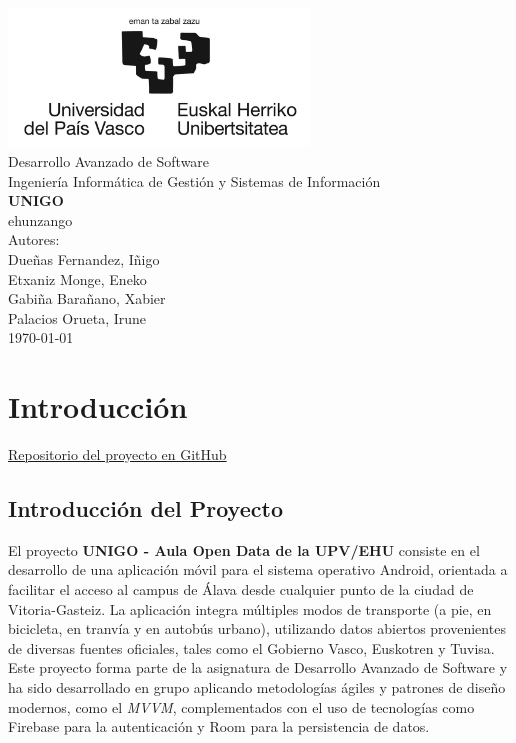 \documentclass[a4paper,12pt]{report}
\begin{document}
  \begin{titlepage}
    \centering
    \includegraphics[width=0.6\textwidth]{../.img/logoEHU_largo.jpg}\\
    \vspace{1cm}
    \LARGE Desarrollo Avanzado de Software\\
    \vspace{0.5cm}
    \Large Ingeniería Informática de Gestión y Sistemas de Información\\
    \vspace{3cm}
    \vspace{0.5cm}
    \Huge \textbf{UNIGO}\\
    \huge ehunzango\\
    \vspace{2.5cm}
    \Large Autores:\\
    \vspace{0.2cm}
    \large Dueñas Fernandez, Iñigo\\
    \large Etxaniz Monge, Eneko\\
    \large Gabiña Barañano, Xabier\\
    \large Palacios Orueta, Irune\\
    \vfill
    \today
  \end{titlepage}
  \tableofcontents
  \listoffigures
  \chapter{Introducción}
    \begin{center}
      \href{https://github.com/Xabierland/UNIGO}{Repositorio del proyecto en GitHub}
    \end{center}
    \section{Introducción del Proyecto}
      El proyecto \textbf{UNIGO - Aula Open Data de la UPV/EHU} consiste en el desarrollo de una aplicación móvil para el sistema operativo Android, orientada a facilitar el acceso al campus de Álava desde cualquier punto de la ciudad de Vitoria-Gasteiz. La aplicación integra múltiples modos de transporte (a pie, en bicicleta, en tranvía y en autobús urbano), utilizando datos abiertos provenientes de diversas fuentes oficiales, tales como el Gobierno Vasco, Euskotren y Tuvisa. Este proyecto forma parte de la asignatura de Desarrollo Avanzado de Software y ha sido desarrollado en grupo aplicando metodologías ágiles y patrones de diseño modernos, como el \textit{MVVM}, complementados con el uso de tecnologías como Firebase para la autenticación y Room para la persistencia de datos.
\end{document}
